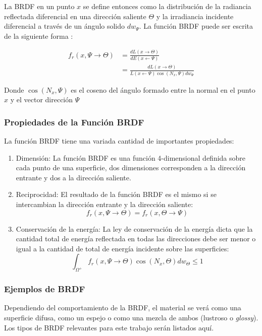 La \ac{BRDF} en un punto $x$ se define entonces como la distribución de la radiancia reflectada diferencial en una dirección saliente $\Theta$ y la irradiancia incidente diferencial a través de un ángulo solido $dw_{\Psi}$. La función \ac{BRDF} puede ser escrita de la siguiente forma \cite{advanced_gi2006}:

\begin{equation}
	\begin{split}
        f_{r}(x, \Psi\to\Theta) &= \frac{dL(x\to\Theta)}{dE(x\gets\Psi)}\\
        &= \frac{dL(x\to\Theta)}{L(x\gets\Psi)\cos(N_{x}, \Psi)dw_{\Psi}}
	\end{split}
	\label{eq:brdf_def}
\end{equation}

Donde $\cos(N_{x}, \Psi)$ es el coseno del ángulo formado entre la normal en el punto $x$ y el vector dirección $\Psi$

\subsubsection{Propiedades de la Función BRDF}

La función BRDF tiene una variada cantidad de importantes propiedades:

\begin{enumerate}
	\item Dimensión: La función BRDF es una función 4-dimensional definida sobre cada punto de una superficie, dos dimensiones corresponden a la dirección entrante y dos a la dirección saliente.
	\item Reciprocidad: El resultado de la función BRDF es el mismo si se intercambian la dirección entrante y la dirección saliente:
    	\begin{equation}
            f_{r}(x, \Psi\to\Theta) = f_{r}(x, \Theta\to\Psi)
    	\end{equation}
	\item Conservación de la energía: La ley de conservación de la energía dicta que la cantidad total de energía reflectada en todas las direcciones debe ser menor o igual a la cantidad de total de energía incidente sobre las superficies: 
    	\begin{equation}
    		\int_{\Omega^{+}}f_{r}(x, \Psi\to\Theta)\cos(N_{x}, \Theta)dw_{\Theta} \leq 1
    	\end{equation}
\end{enumerate}

\subsubsection{Ejemplos de BRDF}
Dependiendo del comportamiento de la \ac{BRDF}, el material se verá como una superficie difusa, como un espejo o como una mezcla de ambos (lustroso o \emph{glossy}). Los tipos de BRDF relevantes para este trabajo serán listados aquí.

